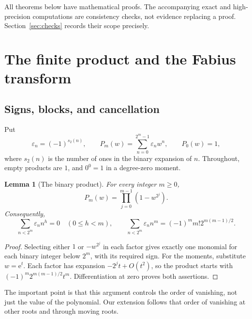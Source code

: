 \documentclass[11pt,letterpaper]{article}
\numberwithin{equation}{section}
\newtheorem{lemma}[theorem]{Lemma}
\theoremstyle{definition}
\theoremstyle{remark}
\newcommand{\eps}{\varepsilon}
\newcommand{\e}{\mathrm e}
\begin{document}
All theorems below have mathematical proofs. The accompanying exact and high-precision computations are consistency checks, not evidence replacing a proof. Section~\ref{sec:checks} records their scope precisely.

\section{The finite product and the Fabius transform}
\label{sec:background}

\subsection{Signs, blocks, and cancellation}
Put
\begin{equation}
 \eps_n=(-1)^{s_2(n)},\qquad
 P_m(w)=\sum_{n=0}^{2^m-1}\eps_n w^n,\qquad P_0(w)=1,
 \label{eq:Pm}
\end{equation}
where \(s_2(n)\) is the number of ones in the binary expansion of \(n\). Throughout, empty products are \(1\), and \(0^0=1\) in a degree-zero moment.

\begin{lemma}[The binary product]
For every integer \(m\geq0\),
\begin{equation}
 P_m(w)=\prod_{j=0}^{m-1}(1-w^{2^j}).
 \label{eq:product}
\end{equation}
Consequently,
\begin{equation}
 \sum_{n<2^m}\eps_n n^h=0\quad(0\leq h<m),\qquad
 \sum_{n<2^m}\eps_n n^m=(-1)^m m!2^{m(m-1)/2}.
 \label{eq:prouhet}
\end{equation}
\end{lemma}
\begin{proof}
Selecting either \(1\) or \(-w^{2^j}\) in each factor gives exactly one monomial for each binary integer below \(2^m\), with its required sign. For the moments, substitute \(w=\e^t\). Each factor has expansion \(-2^jt+O(t^2)\), so the product starts with \((-1)^m2^{m(m-1)/2}t^m\). Differentiation at zero proves both assertions.
\end{proof}

The important point is that this argument controls the order of vanishing, not just the value of the polynomial. Our extension follows that order of vanishing at other roots and through moving roots.
\end{document}
